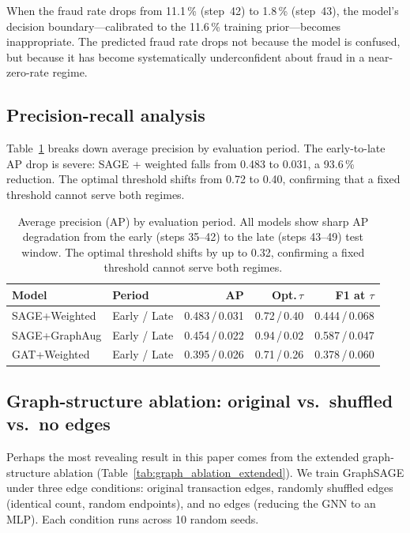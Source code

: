 When the fraud rate drops from 11.1\,\% (step~42) to 1.8\,\%
(step~43), the model's decision boundary---calibrated to the 11.6\,\%
training prior---becomes inappropriate.  The predicted fraud rate
drops not because the model is confused, but because it has become
systematically underconfident about fraud in a near-zero-rate regime.

\subsection{Precision-recall analysis}
\label{sec:pr_analysis}

Table~\ref{tab:pr_analysis} breaks down average precision by evaluation
period.  The early-to-late AP drop is severe: SAGE + weighted falls
from 0.483 to 0.031, a 93.6\,\% reduction.  The optimal threshold
shifts from 0.72 to 0.40, confirming that a fixed threshold cannot
serve both regimes.

\begin{table}[htbp]
\centering
\caption{Average precision (AP) by evaluation period.  All models show
  sharp AP degradation from the early (steps 35--42) to the late
  (steps 43--49) test window.  The optimal threshold shifts by up to
  0.32, confirming a fixed threshold cannot serve both regimes.}
\label{tab:pr_analysis}
\small
\begin{tabular}{llrrr}
\toprule
\textbf{Model} & \textbf{Period} & \textbf{AP}
  & \textbf{Opt.\,$\tau$} & \textbf{F1 at $\tau$} \\
\midrule
SAGE+Weighted & Early / Late  & 0.483\,/\,0.031 & 0.72\,/\,0.40 & 0.444\,/\,0.068 \\
SAGE+GraphAug & Early / Late  & 0.454\,/\,0.022 & 0.94\,/\,0.02 & 0.587\,/\,0.047 \\
GAT+Weighted  & Early / Late  & 0.395\,/\,0.026 & 0.71\,/\,0.26 & 0.378\,/\,0.060 \\
\bottomrule
\end{tabular}
\end{table}

\subsection{Graph-structure ablation: original vs.\ shuffled vs.\ no edges}
\label{sec:graph_ablation}

Perhaps the most revealing result in this paper comes from the extended
graph-structure ablation (Table~\ref{tab:graph_ablation_extended}).
We train GraphSAGE under three edge conditions: original transaction edges,
randomly shuffled edges (identical count, random endpoints), and no edges
(reducing the GNN to an MLP).  Each condition runs across 10 random seeds.

